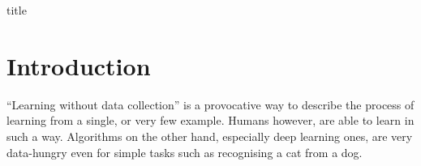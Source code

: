 \documentclass[12pt]{article}
\begin{document}
{title}

\tableofcontents



 



\section{Introduction}
``Learning without data collection'' is a provocative way to describe the process of learning from a single, or very few example. Humans however, are able to learn in such a way. Algorithms on the other hand, especially deep learning ones, are very data-hungry even for simple tasks such as recognising a cat from a dog.
\end{document}
